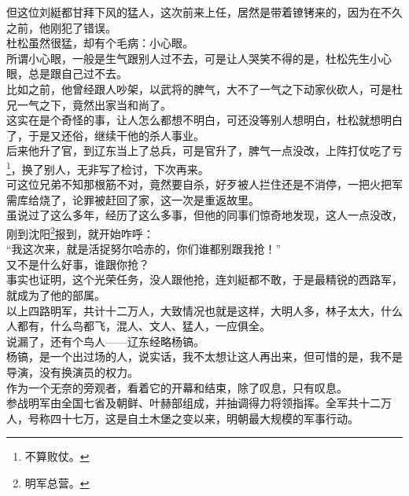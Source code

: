 \begin{multicols}{\theparacolNo}
但这位刘綎都甘拜下风的猛人，这次前来上任，居然是带着镣铐来的，因为在不久之前，他刚犯了错误。\\

杜松虽然很猛，却有个毛病：小心眼。\\

所谓小心眼，一般是生气跟别人过不去，可是让人哭笑不得的是，杜松先生小心眼，总是跟自己过不去。\\

比如之前，他曾经跟人吵架，以武将的脾气，大不了一气之下动家伙砍人，可是杜兄一气之下，竟然出家当和尚了。\\

这实在是个奇怪的事，让人怎么都想不明白，可还没等别人想明白，杜松就想明白了，于是又还俗，继续干他的杀人事业。\\

后来他升了官，到辽东当上了总兵，可是官升了，脾气一点没改，上阵打仗吃了亏\footnote{不算败仗。}，换了别人，无非写了检讨，下次再来。\\

可这位兄弟不知那根筋不对，竟然要自杀，好歹被人拦住还是不消停，一把火把军需库给烧了，论罪被赶回了家，这一次是重返故里。\\

虽说过了这么多年，经历了这么多事，但他的同事们惊奇地发现，这人一点没改，刚到沈阳\footnote{明军总营。}报到，就开始咋呼：\\

“我这次来，就是活捉努尔哈赤的，你们谁都别跟我抢！”\\

又不是什么好事，谁跟你抢？\\

事实也证明，这个光荣任务，没人跟他抢，连刘綎都不敢，于是最精锐的西路军，就成为了他的部属。\\

以上四路明军，共计十二万人，大致情况也就是这样，大明人多，林子太大，什么人都有，什么鸟都飞，混人、文人、猛人，一应俱全。\\

说漏了，还有个鸟人——辽东经略杨镐。\\

杨镐，是一个出过场的人，说实话，我不太想让这人再出来，但可惜的是，我不是导演，没有换演员的权力。\\

作为一个无奈的旁观者，看着它的开幕和结束，除了叹息，只有叹息。\\

参战明军由全国七省及朝鲜、叶赫部组成，并抽调得力将领指挥。全军共十二万人，号称四十七万，这是自土木堡之变以来，明朝最大规模的军事行动。\\


\end{multicols}
